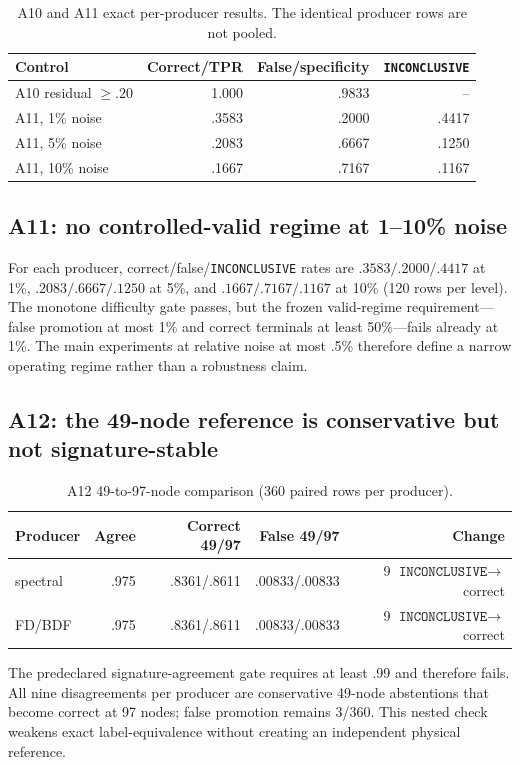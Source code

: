 \documentclass{article}
\newcommand{\INC}{\texttt{INCONCLUSIVE}\xspace}
\begin{document}
\begin{table}[ht]
\centering\small
\caption{A10 and A11 exact per-producer results. The identical producer rows are not pooled.}
\begin{tabular}{lrrr}
\toprule
Control & Correct/TPR & False/specificity & \INC \\
\midrule
A10 residual $\ge .20$ & 1.000 & .9833 & -- \\
A11, 1\% noise & .3583 & .2000 & .4417 \\
A11, 5\% noise & .2083 & .6667 & .1250 \\
A11, 10\% noise & .1667 & .7167 & .1167 \\
\bottomrule
\end{tabular}
\end{table}

\subsection{A11: no controlled-valid regime at 1--10\% noise}

For each producer, correct/false/\INC rates are $.3583/.2000/.4417$ at 1\%,
$.2083/.6667/.1250$ at 5\%, and $.1667/.7167/.1167$ at 10\% (120 rows per level). The monotone
difficulty gate passes, but the frozen valid-regime requirement---false promotion at most 1\% and
correct terminals at least 50\%---fails already at 1\%. The main experiments at relative noise at
most .5\% therefore define a narrow operating regime rather than a robustness claim.

\subsection{A12: the 49-node reference is conservative but not signature-stable}

\begin{table}[ht]
\centering\scriptsize
\caption{A12 49-to-97-node comparison (360 paired rows per producer).}
\begin{tabular}{lrrrr}
\toprule
Producer & Agree & Correct 49/97 & False 49/97 & Change \\
\midrule
spectral & .975 & .8361/.8611 & .00833/.00833 & 9 $\INC\to$ correct \\
FD/BDF & .975 & .8361/.8611 & .00833/.00833 & 9 $\INC\to$ correct \\
\bottomrule
\end{tabular}
\end{table}
The predeclared signature-agreement gate requires at least .99 and therefore fails. All nine
disagreements per producer are conservative 49-node abstentions that become correct at 97 nodes;
false promotion remains 3/360. This nested check weakens exact label-equivalence without creating
an independent physical reference.
\end{document}

